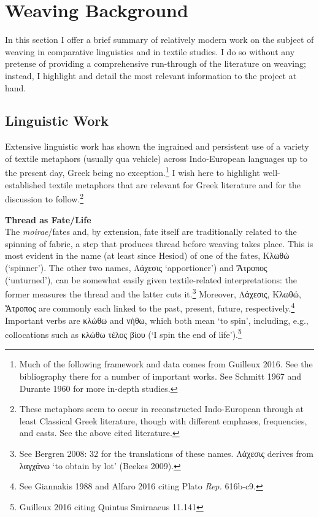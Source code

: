 \documentclass[12pt]{article}
\begin{document}
\section{Weaving Background}\label{background0}

In this section I offer a brief summary of relatively modern work on the subject of weaving in comparative linguistics and in textile studies. I do so without any pretense of providing a comprehensive run-through of the literature on weaving; instead, I highlight and detail the most relevant information to the project at hand.

\subsection{Linguistic Work}\label{background1}

Extensive linguistic work has shown the ingrained and persistent use of a variety of textile metaphors (usually qua vehicle) across Indo-European languages up to the present day, Greek being no exception.\footnote{ Much of the following framework and data comes from Guilleux 2016. See the bibliography there for a number of important works. See Schmitt 1967 and Durante 1960 for more in-depth studies.} I wish here to highlight well-established textile metaphors that are relevant for Greek literature and for the discussion to follow.\footnote{ These metaphors seem to occur in reconstructed Indo-European through at least Classical Greek literature, though with different emphases, frequencies, and casts. See the above cited literature.}

\noindent \hfill \par
\noindent \textbf{Thread as Fate/Life} \\
The \textit{moirae}/fates and, by extension, fate itself are traditionally related to the spinning of fabric, a step that produces thread before weaving takes place. This is most evident in the name (at least since Hesiod) of one of the fates, Κλωθώ (`spinner'). The other two names, Λάχεσις `apportioner') and Ἄτροπος (`unturned'), can be somewhat easily given textile-related interpretations: the former measures the thread and the latter cuts it.\footnote{ See Bergren 2008: 32 for the translations of these names. Λάχεσις derives from λαγχάνω `to obtain by lot' (Beekes 2009).} Moreover, Λάχεσις, Κλωθώ, Ἄτροπος are commonly each linked to the past, present, future, respectively.\footnote{ See Giannakis 1988 and Alfaro 2016 citing Plato \textit{Rep.} 616b-c9.} Important verbs are κλώθω and νήθω, which both mean `to spin', including, e.g., collocations such as κλώθω τέλος βίου (`I spin the end of life').\footnote{ Guilleux 2016 citing Quintus Smirnaeus 11.141}
\end{document}
